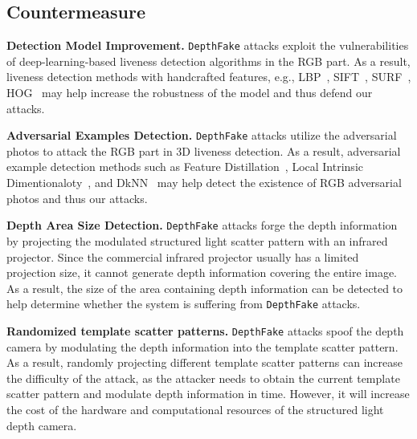 


\subsection{Countermeasure}

\textbf{Detection Model Improvement. } \texttt{DepthFake} attacks exploit the vulnerabilities of deep-learning-based liveness detection algorithms in the RGB part. 
As a result, liveness detection methods with handcrafted features, e.g., LBP~\cite{de2012lbp, boulkenafet2015face}, SIFT~\cite{patel2016secure}, SURF~\cite{boulkenafet2016face}, HOG~\cite{komulainen2013context} may help increase the robustness of the model and thus defend our attacks. 

\textbf{Adversarial Examples Detection.} \texttt{DepthFake} attacks utilize the adversarial photos to attack the RGB part in  3D liveness detection. 
As a result, adversarial example detection methods such as Feature Distillation~\cite{liu2019feature}, Local Intrinsic Dimentionaloty~\cite{ma2018characterizing}, and DkNN~\cite{papernot2018deep}  may help detect the existence of  RGB adversarial photos and thus our attacks.

\textbf{Depth Area Size Detection. }  \texttt{DepthFake} attacks forge the depth information by projecting the modulated structured light scatter pattern with an infrared projector. Since the commercial infrared projector usually has a limited projection size, it cannot generate depth information covering the entire image. As a result,  the size of the area containing depth information can be detected to help determine whether the system is suffering from \texttt{DepthFake} attacks.

\textbf{Randomized template scatter patterns.}  \texttt{DepthFake} attacks spoof the depth camera by modulating the depth information into the template scatter pattern. As a result, randomly projecting  different template scatter patterns can increase the difficulty of the attack, as the attacker needs to obtain the current template scatter pattern and modulate depth information in time. However, it will increase the cost of the hardware and computational resources of the structured light depth camera.


